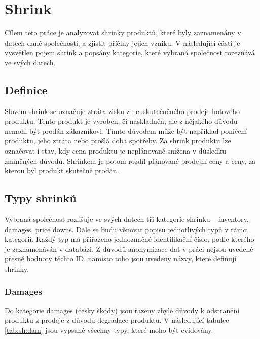 \chapter{Shrink}

Cílem této práce je analyzovat shrinky produktů, které byly zaznamenány v datech dané společnosti, a zjistit příčiny jejich vzniku. V následující části je vysvětlen pojem shrink a popsány kategorie, které vybraná společnost rozeznává ve svých datech.

\section{Definice}

Slovem shrink se označuje ztráta zisku z neuskutečněného prodeje hotového produktu. Tento produkt je vyroben, či naskladněn, ale z nějakého důvodu nemohl být prodán zákazníkovi. Tímto důvodem může být například poničení produktu, jeho ztráta nebo prošlá doba spotřeby. Za shrink produktu lze označovat i stav, kdy cena produktu je neplánovaně snížena v důsledku zmíněných důvodů. Shrinkem je potom rozdíl plánované prodejní ceny a ceny, za kterou byl produkt skutečně prodán.\cite{bib:DefShrink}



\section{Typy shrinků}

Vybraná společnost rozlišuje ve svých datech tři kategorie shrinku -- inventory, damages, price downs. Dále se budu věnovat popisu jednotlivých typů v rámci kategorií. Každý typ má přiřazeno jednoznačné identifikační číslo, podle kterého je zaznamenáván v databázi. Z důvodů anonymizace dat v práci nejsou uvedené přesné hodnoty těchto ID, namísto toho jsou uvedeny názvy, které  definují shrinky.

\subsection*{Damages}

Do kategorie damages (česky škody) jsou řazeny zbylé důvody k odstranění produktu z prodeje z důvodu degradace produktu. V následující tabulce \ref{tab:sh:dam} jsou vypsané všechny typy, které moho být evidovány.


